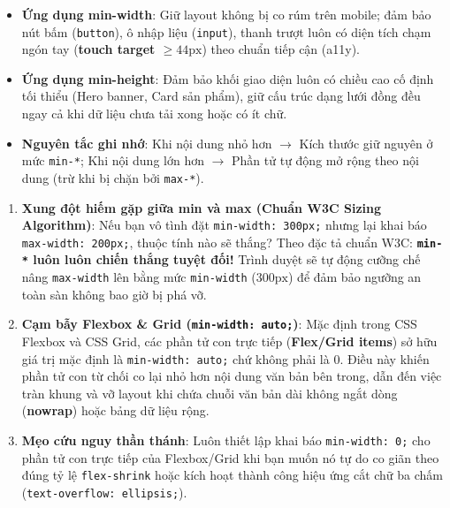 \documentclass[11pt,oneside]{book}
\newcommand{\codeinline}[1]{\textcolor{accentOrange}{\texttt{#1}}}
\newcommand{\term}[1]{\textbf{\textcolor{primaryBlue}{#1}}}
\begin{document}
\begin{noteBox}
\begin{itemize}[leftmargin=1.2em, itemsep=2.5pt, parsep=0pt]
    \item \textbf{Ứng dụng min-width}: Giữ layout không bị co rúm trên mobile; đảm bảo nút bấm (\codeinline{button}), ô nhập liệu (\codeinline{input}), thanh trượt luôn có diện tích chạm ngón tay (\term{touch target $\ge 44\text{px}$}) theo chuẩn tiếp cận (a11y).
    \item \textbf{Ứng dụng min-height}: Đảm bảo khối giao diện luôn có chiều cao cố định tối thiểu (Hero banner, Card sản phẩm), giữ cấu trúc dạng lưới đồng đều ngay cả khi dữ liệu chưa tải xong hoặc có ít chữ.
    \item \textbf{Nguyên tắc ghi nhớ}: Khi nội dung nhỏ hơn $\rightarrow$ Kích thước giữ nguyên ở mức \codeinline{min-*}; Khi nội dung lớn hơn $\rightarrow$ Phần tử tự động mở rộng theo nội dung (trừ khi bị chặn bởi \codeinline{max-*}).
\end{itemize}
\end{noteBox}

\begin{tipBox}
\begin{enumerate}[leftmargin=1.5em, itemsep=3.5pt, parsep=0pt]
    \item \textbf{Xung đột hiếm gặp giữa min và max (Chuẩn W3C Sizing Algorithm)}: Nếu bạn vô tình đặt \codeinline{min-width: 300px;} nhưng lại khai báo \codeinline{max-width: 200px;}, thuộc tính nào sẽ thắng? Theo đặc tả chuẩn W3C: \textbf{\codeinline{min-*} luôn luôn chiến thắng tuyệt đối!} Trình duyệt sẽ tự động cưỡng chế nâng \codeinline{max-width} lên bằng mức \codeinline{min-width} ($300\text{px}$) để đảm bảo ngưỡng an toàn sàn không bao giờ bị phá vỡ.
    \item \textbf{Cạm bẫy Flexbox \& Grid (\codeinline{min-width: auto;})}: Mặc định trong CSS Flexbox và CSS Grid, các phần tử con trực tiếp (\term{Flex/Grid items}) sở hữu giá trị mặc định là \codeinline{min-width: auto;} chứ không phải là $0$. Điều này khiến phần tử con từ chối co lại nhỏ hơn nội dung văn bản bên trong, dẫn đến việc tràn khung và vỡ layout khi chứa chuỗi văn bản dài không ngắt dòng (\term{nowrap}) hoặc bảng dữ liệu rộng.
    \item \textbf{Mẹo cứu nguy thần thánh}: Luôn thiết lập khai báo \codeinline{min-width: 0;} cho phần tử con trực tiếp của Flexbox/Grid khi bạn muốn nó tự do co giãn theo đúng tỷ lệ \codeinline{flex-shrink} hoặc kích hoạt thành công hiệu ứng cắt chữ ba chấm (\codeinline{text-overflow: ellipsis;}).
\end{enumerate}
\end{tipBox}
\end{document}
